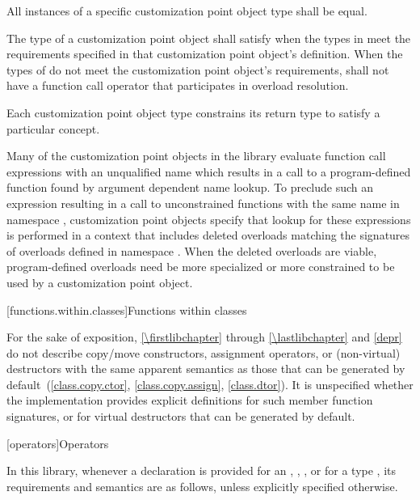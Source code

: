\pnum
All instances of a specific customization point object type shall
be equal.

\pnum
The type  of a customization point object shall satisfy
when the types in  meet the requirements specified in that
customization point object's definition. When the types of  do
not meet the customization point object's requirements,  shall not have
a function call operator that participates in overload resolution.

\pnum
Each customization point object type constrains its return type to satisfy a
particular concept.

\pnum
\begin{note}
Many of the customization point objects in the library evaluate function call
expressions with an unqualified name which results in a call to a
program-defined function found by argument dependent name
lookup. To preclude such an expression resulting in a
call to unconstrained functions with the same name in namespace ,
customization point objects specify that lookup for these expressions is
performed in a context that includes deleted overloads matching the signatures
of overloads defined in namespace . When the deleted overloads are
viable, program-defined overloads need be more specialized
or more constrained to be used by a customization point
object.
\end{note}

[functions.within.classes]{Functions within classes}

\pnum
For the sake of exposition, \ref{\firstlibchapter} through \ref{\lastlibchapter}
and \ref{depr} do not describe copy/move constructors, assignment
operators, or (non-virtual) destructors with the same apparent
semantics as those that can be generated
by default~(\ref{class.copy.ctor}, \ref{class.copy.assign}, \ref{class.dtor}).
%
%
%
It is unspecified whether
the implementation provides explicit definitions for such member function
signatures, or for virtual destructors that can be generated by default.

[operators]{Operators}

\pnum
In this library, whenever a declaration is provided for an ,
, , or 
for a type ,
its requirements and semantics are as follows,
unless explicitly specified otherwise.


